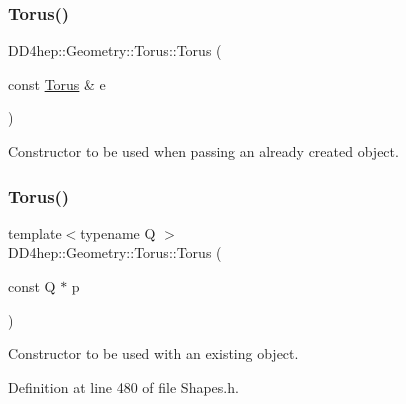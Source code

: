 \hypertarget{class_d_d4hep_1_1_geometry_1_1_torus_a8c22c483791b6ad515befdbbbc8fbbfe}{}\label{class_d_d4hep_1_1_geometry_1_1_torus_a8c22c483791b6ad515befdbbbc8fbbfe} 
\subsubsection{\texorpdfstring{Torus()}{Torus()}\hspace{0.1cm}{\footnotesize\ttfamily [2/6]}}
{\footnotesize\ttfamily D\+D4hep\+::\+Geometry\+::\+Torus\+::\+Torus (\begin{DoxyParamCaption}\item[{const \hyperlink{class_d_d4hep_1_1_geometry_1_1_torus}{Torus} \&}]{e }\end{DoxyParamCaption})\hspace{0.3cm}{\ttfamily [default]}}



Constructor to be used when passing an already created object. 

\hypertarget{class_d_d4hep_1_1_geometry_1_1_torus_afc607aed036a03378c0d1d97cc1b5ae7}{}\label{class_d_d4hep_1_1_geometry_1_1_torus_afc607aed036a03378c0d1d97cc1b5ae7} 
\subsubsection{\texorpdfstring{Torus()}{Torus()}\hspace{0.1cm}{\footnotesize\ttfamily [3/6]}}
{\footnotesize\ttfamily template$<$typename Q $>$ \\
D\+D4hep\+::\+Geometry\+::\+Torus\+::\+Torus (\begin{DoxyParamCaption}\item[{const Q $\ast$}]{p }\end{DoxyParamCaption})\hspace{0.3cm}{\ttfamily [inline]}}



Constructor to be used with an existing object. 



Definition at line 480 of file Shapes.\+h.

\hypertarget{class_d_d4hep_1_1_geometry_1_1_torus_a3916dafec28122360c4b68fa9a1c0444}{}\label{class_d_d4hep_1_1_geometry_1_1_torus_a3916dafec28122360c4b68fa9a1c0444} 
